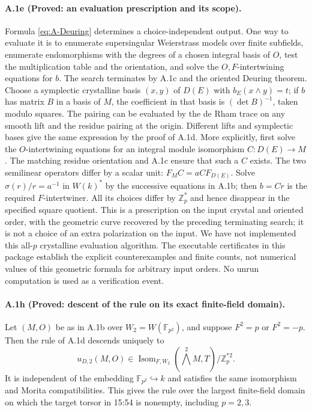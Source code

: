 \paragraph{A.1e (Proved: an evaluation prescription and its scope).}
Formula \eqref{eq:A-Deuring} determines a choice-independent output.
One way to evaluate it is to enumerate supersingular
Weierstrass models over finite subfields, enumerate endomorphisms with
the degrees of a chosen integral basis of $O$, test the multiplication
table and the orientation, and solve the $O,F$-intertwining equations
for $b$. The search terminates by A.1c and the oriented Deuring theorem.
Choose a symplectic crystalline basis $(x,y)$ of $D(E)$ with
$b_E(x\wedge y)=t$; if $b$ has matrix $B$ in a basis of $M$, the
coefficient in that basis is $(\det B)^{-1}$, taken modulo squares.
The pairing can be evaluated by the de Rham trace on any smooth lift
and the residue pairing at the origin. Different lifts and symplectic
bases give the same expression by the proof of A.1d. More explicitly,
first solve the $O$-intertwining equations for an integral module
isomorphism $C:D(E)\to M$. The matching residue orientation and A.1c
ensure that such a $C$ exists. The two semilinear operators differ by
a scalar unit: $F_M C=aC F_{D(E)}$. Solve
$\sigma(r)/r=a^{-1}$ in $W(k)^*$ by the successive equations in
A.1b; then $b=Cr$ is the required $F$-intertwiner. All its choices
differ by $\mathbb Z_p^*$ and hence disappear in the specified
square quotient. This is a prescription on the input crystal and
oriented order, with the geometric curve recovered by the preceding
terminating search; it is not a choice of an extra polarization on
the input. We have not implemented this all-$p$ crystalline evaluation algorithm.
The executable certificates in this package establish the explicit
counterexamples and finite counts, not numerical values of this
geometric formula for arbitrary input orders. No unrun computation
is used as a verification event.

\paragraph{A.1h (Proved: descent of the rule on its exact finite-field domain).}
Let $(M,O)$ be as in A.1b over $W_2=W(\mathbb F_{p^2})$, and suppose
$F^2=p$ or $F^2=-p$. Then the rule of A.1d descends uniquely to
\[
 u_{D,2}(M,O)\in
 \operatorname{Isom}_{F,W_2}(\bigwedge^2M,T)/\mathbb Z_p^{*2}.
\]
It is independent of the embedding $\mathbb F_{p^2}\hookrightarrow k$
and satisfies the same isomorphism and Morita compatibilities.
This gives the rule over the largest finite-field domain on which
the target torsor in 15:54 is nonempty, including $p=2,3$.

